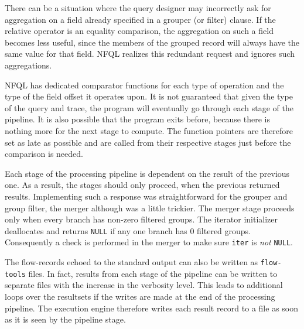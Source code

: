 There can be a situation where the query designer may incorrectly ask for
aggregation on a field already specified in a grouper (or filter) clause. If
the relative operator is an equality comparison, the aggregation on such a
field becomes less useful, since the members of the grouped record will always
have the same value for that field. \ac{NFQL} realizes this redundant request
and ignores such aggregations.

\ac{NFQL} has dedicated comparator functions for each type of operation and
the type of the field offset it operates upon. It is not guaranteed that given
the type of the query and trace, the program will eventually go through each
stage of the pipeline. It is also possible that the program exits before,
because there is nothing more for the next stage to compute. The function
pointers are therefore set as late as possible and are called from their
respective stages just before the comparison is needed.

Each stage of the processing pipeline is dependent on the result of the
previous one. As a result, the stages should only proceed, when the previous
returned results. Implementing such a response was straightforward for the
grouper and group filter, the merger although was a little trickier.  The
merger stage proceeds only when every branch has non-zero filtered groups.
The iterator initializer deallocates and returns \texttt{NULL} if any one
branch has $0$ filtered groups.  Consequently a check is performed in the
merger to make sure \texttt{iter} is \emph{not} \texttt{NULL}.

The flow-records echoed to the standard output can also be written as
\texttt{flow-tools} files. In fact, results from each stage of the pipeline
can be written to separate files with the increase in the verbosity level.
This leads to additional loops over the resultsets if the writes are made at
the end of the processing pipeline. The execution engine therefore writes each
result record to a file as soon as it is seen by the pipeline stage.
